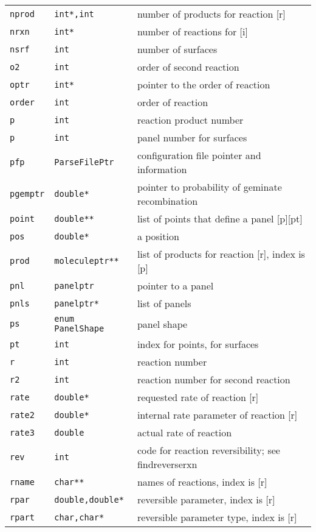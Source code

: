 \documentclass {scrbook}
\newcommand {\ttt} {\texttt}
\begin{document}
\begin{longtable}[c]{lll}
\ttt{nprod} & \ttt{int*,int} & number of products for reaction [r]\\
\ttt{nrxn} & \ttt{int*} & number of reactions for [i]\\
\ttt{nsrf} & \ttt{int} & number of surfaces\\
\ttt{o2} & \ttt{int} & order of second reaction\\
\ttt{optr} & \ttt{int*} & pointer to the order of reaction\\
\ttt{order} & \ttt{int} & order of reaction\\
\ttt{p} & \ttt{int} & reaction product number\\
\ttt{p} & \ttt{int} & panel number for surfaces\\
\ttt{pfp} & \ttt{ParseFilePtr} & configuration file pointer and information\\
\ttt{pgemptr} & \ttt{double*} & pointer to probability of geminate recombination\\
\ttt{point} & \ttt{double**} & list of points that define a panel [p][pt]\\
\ttt{pos} & \ttt{double*} & a position\\
\ttt{prod} & \ttt{moleculeptr**} & list of products for reaction [r], index is [p]\\
\ttt{pnl} & \ttt{panelptr} & pointer to a panel\\
\ttt{pnls} & \ttt{panelptr*} & list of panels\\
\ttt{ps} & \ttt{enum PanelShape} & panel shape\\
\ttt{pt} & \ttt{int} & index for points, for surfaces\\
\ttt{r} & \ttt{int} & reaction number\\
\ttt{r2} & \ttt{int} & reaction number for second reaction\\
\ttt{rate} & \ttt{double*} & requested rate of reaction [r]\\
\ttt{rate2} & \ttt{double*} & internal rate parameter of reaction [r]\\
\ttt{rate3} & \ttt{double} & actual rate of reaction\\
\ttt{rev} & \ttt{int} & code for reaction reversibility; see findreverserxn\\
\ttt{rname} & \ttt{char**} & names of reactions, index is [r]\\
\ttt{rpar} & \ttt{double,double*} & reversible parameter, index is [r]\\
\ttt{rpart} & \ttt{char,char*} & reversible parameter type, index is [r]\\

\end{longtable}
\end{document}
